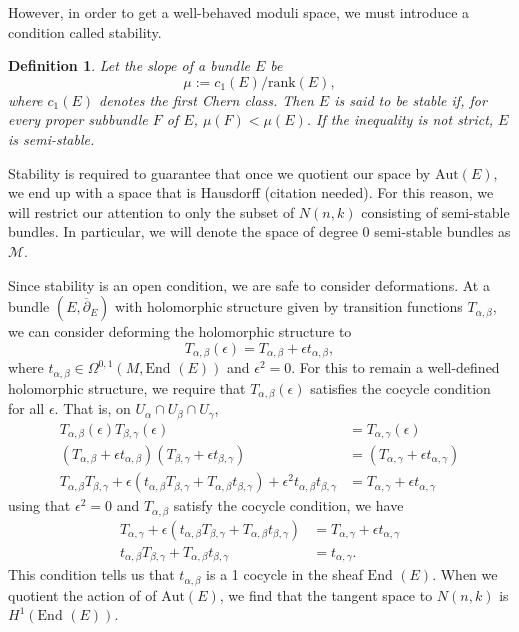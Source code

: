 \documentclass[]{article}
\newtheorem{definition}{Definition}
\newcommand{\MM}{\mathcal{M}}
\newcommand{\End}{\text{End }}
\newcommand{\dbar}{\overline{\partial}}
\begin{document}
	However, in order to get a well-behaved moduli space, we must introduce a condition called stability. 
	\begin{definition}
		Let the \textit{slope} of a bundle $E$ be
		$$\mu := c_1(E)/\text{rank}(E),$$
		where $c_1(E)$ denotes the first Chern class. Then $E$ is said to be \textit{stable} if, for every proper subbundle $F$ of $E$, $\mu(F) < \mu(E)$. If the inequality is not strict, $E$ is \textit{semi-stable}.
	\end{definition}
	Stability is required to guarantee that once we quotient our space by $\text{Aut}(E)$, we end up with a space that is Hausdorff (citation needed). For this reason, we will restrict our attention to only the subset of $N(n,k)$ consisting of semi-stable bundles. In particular, we will denote the space of degree $0$ semi-stable bundles as $\MM$.
	
	Since stability is an open condition, we are safe to consider deformations. At a bundle $(E,\dbar_E)$ with holomorphic structure given by transition functions $T_{\alpha,\beta}$, we can consider deforming the holomorphic structure to 
	\begin{equation}
		T_{\alpha,\beta}(\epsilon) = T_{\alpha,\beta} + \epsilon t_{\alpha,\beta},
	\end{equation}
	where $t_{\alpha,\beta} \in \Omega^{0,1}(M,\End(E))$ and $\epsilon^2=0$. For this to remain a well-defined holomorphic structure, we require that $T_{\alpha,\beta}(\epsilon)$ satisfies the cocycle condition for all $\epsilon$. That is, on $U_{\alpha}\cap U_{\beta}\cap U_{\gamma}$,
	\begin{align*}
		T_{\alpha,\beta}(\epsilon)T_{\beta,\gamma}(\epsilon) &= T_{\alpha,\gamma}(\epsilon)\\
		\left(T_{\alpha,\beta} + \epsilon t_{\alpha,\beta} \right)
		\left(T_{\beta,\gamma} + \epsilon t_{\beta,\gamma} \right) &=
		\left(T_{\alpha,\gamma} + \epsilon t_{\alpha,\gamma} \right)\\
		T_{\alpha,\beta}T_{\beta,\gamma} + \epsilon(t_{\alpha,\beta}T_{\beta,\gamma} + T_{\alpha,\beta} t_{\beta,\gamma}) + \epsilon^2 t_{\alpha,\beta}t_{\beta,\gamma} &= T_{\alpha,\gamma} + \epsilon t_{\alpha,\gamma}
	\end{align*}
	using that $\epsilon^2 = 0$ and $T_{\alpha,\beta}$ satisfy the cocycle condition, we have
	\begin{align*}
		T_{\alpha,\gamma} + \epsilon(t_{\alpha,\beta} T_{\beta,\gamma} + T_{\alpha,\beta} t_{\beta,\gamma}) &= T_{\alpha,\gamma} + \epsilon t_{\alpha,\gamma}\\
		t_{\alpha,\beta} T_{\beta,\gamma} + T_{\alpha,\beta} t_{\beta,\gamma} &= t_{\alpha,\gamma}.
	\end{align*}
	This condition tells us that $t_{\alpha,\beta}$ is a 1 cocycle in the sheaf $\End(E)$. When we quotient the action of of $\text{Aut}(E)$, we find that the tangent space to $N(n,k)$ is $H^1(\End(E))$. 
	
\end{document}
